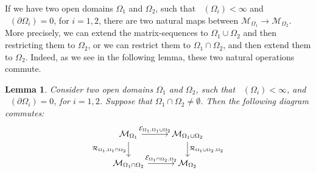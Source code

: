 \documentclass{amsart}
\newtheorem{lem}[thm]{Lemma}
\DeclareMathOperator{\Ld}{\mathcal{L}^d}
\begin{document}
    If we have two open domains $\Omega_1$ and $\Omega_2$, such that $\Ld(\Omega_i)<\infty$ and $\Ld(\partial\Omega_i)=0$, for $i=1,2$, there are two natural maps between $\mathcal{M}_{\Omega_1}\to\mathcal{M}_{\Omega_2}$. More precisely, we can extend the matrix-sequences to $\Omega_1\cup\Omega_2$ and then restricting them to $\Omega_2$, or we can restrict them to $\Omega_1\cap\Omega_2$, and then extend them to $\Omega_2$. Indeed, as we see in the following lemma, these two natural operations commute.
\begin{lem}\label{lem:auxiliary_lem1}
    Consider two open domains $\Omega_1$ and $\Omega_2$, such that $\Ld(\Omega_i)<\infty$, and $\Ld(\partial\Omega_i)=0$, for $i=1,2$. Suppose that $\Omega_1\cap\Omega_2\neq\emptyset$. Then the following diagram commutes:
    \[ \begin{tikzcd}
\mathcal{M}_{\Omega_1} \arrow{r}{\mathcal{E}_{\Omega_1,\Omega_1\cup\Omega_2}}\arrow[swap]{d}{\mathcal{R}_{\Omega_1,\Omega_1\cap\Omega_2}} & \mathcal{M}_{\Omega_1\cup\Omega_2} \arrow{d}{\mathcal{R}_{\Omega_1\cup\Omega_2,\Omega_2}} \\%
\mathcal{M}_{\Omega_1\cap\Omega_2} \arrow{r}{\mathcal{E}_{\Omega_1\cap\Omega_2,\Omega_2}}& \mathcal{M}_{\Omega_2}
\end{tikzcd}
\]
\end{lem}
\end{document}

